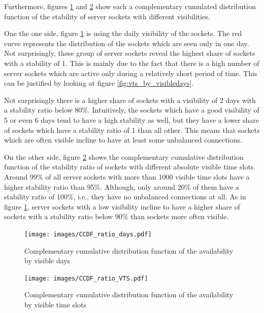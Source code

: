 Furthermore, figures \ref{fig:ccdf_ratio_days} and \ref{fig:ccdf_ratio_vts} show each a complementary cumulated distribution function of the stability of server sockets with different visibilities.

One the one side, figure \ref{fig:ccdf_ratio_days} is using the daily visibility of the sockets. 
The red curve represents the distribution of the sockets which are seen only in one day. 
Not surprisingly, these group of \glspl{server socket} reveal the highest share of sockets with a stability of 1. 
This is mainly due to the fact that there is a high number of \glspl{server socket} which are active only during a relatively short period of time. This can be justified by looking at figure \ref{fig:vts_by_visibledays}.

Not surprisingly there is a higher share of sockets with a visibility of 2 days with a stability ratio below 80\%. 
Intuitively, the sockets which have a good visibility of 5 or even 6 days tend to have a high stability as well, but they have a lower share of sockets which have a stability ratio of 1 than all other. 
This means that sockets which are often visible incline to have at least some unbalanced connections.

On the other side, figure \ref{fig:ccdf_ratio_vts} shows the complementary cumulative distribution function of the stability ratio of sockets with different absolute visible time slots. 
Around 99\% of all \glspl{server socket} with more than 1000 visible time slots have a higher stability ratio than 95\%. 
Although, only around 20\% of them have a stability ratio of 100\%, i.e., they have no unbalanced connections at all. 
As in figure \ref{fig:ccdf_ratio_days}, \glspl{server socket} with a low visibility incline to have a higher share of sockets with a stability ratio below 90\% than sockets more often visible. 
\begin{landscape}
	\begin{figure}
		[p] \centering 
		\texttt{[image: images/CCDF\_ratio\_days.pdf]} \caption{Complementary cumulative distribution function of the availability by visible days} 
		\label{fig:ccdf_ratio_days} 
	\end{figure}
\end{landscape}
\begin{landscape}
	\begin{figure}
		[p] \centering 
		\texttt{[image: images/CCDF\_ratio\_VTS.pdf]} \caption{Complementary cumulative distribution function of the availability by visible time slots} 
		\label{fig:ccdf_ratio_vts} 
	\end{figure}
\end{landscape}


